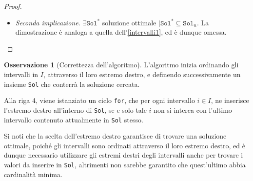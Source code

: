 \documentclass[14pt]{extreport}
\theoremstyle{definition}
\theoremstyle{definition}
\newtheorem{remark}{Osservazione}[subsection]
\begin{document}
\begin{proof}
\begin{itemize}
\begin{itemize}
                \item sia $j \in [1, n) \mid x \in [a_j, b_j]$; allora, si verifica uno dei seguenti casi:
                    \begin{itemize}
                        \item $j \le k \implies \exists \hat x \in \texttt{Sol}_k \mid \hat x \in [a_j, b_j]$ poiché doveva essere già stato analizzato dall'algoritmo
                        \item $j > k + 1 \implies \left \{ \begin{array}{l} b_j > b_{k +1} \\ a_j > a_{k + 1} \end{array} \right.$; si noti inoltre che l'intervallo $[a_j, b_j]$ è stato scelto tale che $x \in [a_j, b_j]$, e poiché $x \in [a_{k +1}, b_{k +1}]$ per sua definizione, si verifica necessariamente che $$\left .\begin{array}{r} x \in [a_j , b_j] \cap [a_{k + 1}, b_{k +1}] \neq \varnothing \\ b_j > b_{k +1} \\ a_j > a_{k +1} \end{array} \right \} \implies a_{k + 1} \le a_j \le x \le b_{k +1} \le b_j$$ in particolare, si noti che $b_{k +1} \in [a_j, b_j]$, e poiché la dimostrazione non dipende dalla scelta di $x \in \texttt{Sol}^* - \texttt{Sol}_k$, né da $j \in [1, n)$, si ha che $b_{k +1}$ copre ogni intervallo coperto da $x$; allora, per far si che esista soluzione ottimale $\texttt{Sol}^*$ tale da contenere $\texttt{Sol}_{k +1} = \texttt{Sol}_k \cup \{b_{k +1}\}$, è sufficiente considerare $$(\texttt{Sol}^* - \{x\}) \cup \{b_{k +1}\}$$
                    \end{itemize}
            \end{itemize}
        \item[] \textit{Seconda implicazione.} $\exists \texttt{Sol}^*$ soluzione ottimale $\mid \texttt{Sol}^* \subseteq \texttt{Sol}_n$. La dimostrazione è analoga a quella dell'\cref{intervalli1}, ed è dunque omessa.
    \end{itemize}
\end{proof}

\begin{remark}[Correttezza dell'algoritmo]
    L'algoritmo inizia ordinando gli intervalli in $I$, attraverso il loro estremo destro, e definendo successivamente un insieme \texttt{Sol} che conterrà la soluzione cercata.

    Alla riga 4, viene istanziato un ciclo \texttt{for}, che per ogni intervallo $i \in I$, ne inserisce l'estremo destro all'interno di \texttt{Sol}, se e solo tale $i$ non si interca con l'ultimo intervallo contenuto attualmente in \texttt{Sol} stesso.

    Si noti che la scelta dell'estremo destro garantisce di trovare una soluzione ottimale, poiché gli intervalli sono ordinati attraverso il loro estremo destro, ed è dunque necessario utilizzare gli estremi destri degli intervalli anche per trovare i valori da inserire in \texttt{Sol}, altrimenti non sarebbe garantito che quest'ultimo abbia cardinalità minima.
\end{remark}
\end{document}
